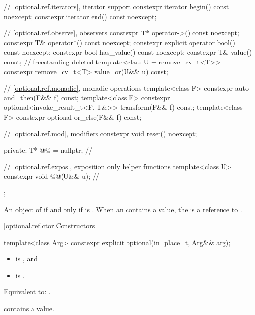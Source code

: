 \begin{codeblock}
{{      // \ref{optional.ref.iterators}, iterator support
      constexpr iterator begin() const noexcept;
      constexpr iterator end() const noexcept;

      // \ref{optional.ref.observe}, observers
      constexpr T*       operator->() const noexcept;
      constexpr T&       operator*() const noexcept;
      constexpr explicit operator bool() const noexcept;
      constexpr bool     has_value() const noexcept;
      constexpr T&       value() const;                         // freestanding-deleted
      template<class U = remove_cv_t<T>>
        constexpr remove_cv_t<T> value_or(U&& u) const;

      // \ref{optional.ref.monadic}, monadic operations
      template<class F> constexpr auto and_then(F&& f) const;
      template<class F> constexpr optional<invoke_result_t<F, T&>> transform(F&& f) const;
      template<class F> constexpr optional or_else(F&& f) const;

      // \ref{optional.ref.mod}, modifiers
      constexpr void reset() noexcept;

    private:
      T* @@ = nullptr;                                         // \expos

      // \ref{optional.ref.expos}, exposition only helper functions
      template<class U>
        constexpr void @@(U&& u);             // \expos
    };
}
\end{codeblock}

\pnum
An object of 
if and only if  is .
When an  contains a value,
the 
is a reference to .

[optional.ref.ctor]{Constructors}

\begin{itemdecl}
template<class Arg>
  constexpr explicit optional(in_place_t, Arg&& arg);
\end{itemdecl}

\begin{itemdescr}
\pnum
\constraints
\begin{itemize}
\item {} is , and
\item {} is .
\end{itemize}

\pnum
\effects
Equivalent to: .

\pnum
\ensures
{} contains a value.
\end{itemdescr}

